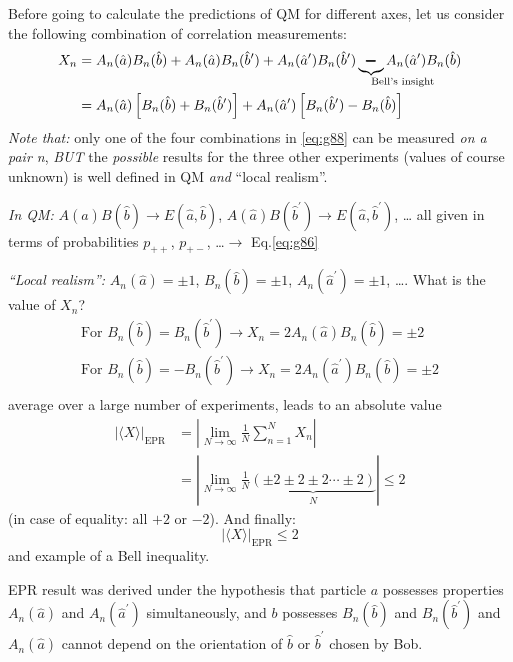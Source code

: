 \documentclass[12pt]{article}
\newcommand{\be}{\begin{equation}}
\newcommand{\ee}{\end{equation}}
\begin{document}
Before going to calculate the predictions of QM
for different axes, let us consider the following
combination of correlation measurements:
\be
\begin{aligned} 
X_{n} 
&=A_{n}(\hat{a}) B_{n}(\hat{b})+A_{n}(\hat{a}) B_{n}(\hat{b}^{\prime})+A_{n}(\hat{a}^{\prime}) B_{n}(\hat{b}^{\prime})\underbrace{\pmb{\boldsymbol{-}}}%
_{\mathrlap{\text{Bell's insight}}}
A_{n}(\hat{a}^{\prime})B_{n}(\hat{b})\\ 
&=A_{n}(\hat{a})\left[B_{n}(\hat{b})+B_{n}(\hat{b}^{\prime})\right]+A_{n}(\hat{a}^{\prime})\left[B_{n}(\hat{b}^{\prime})-B_{n}(\hat{b})\right]
\end{aligned}
\label{eq:g88}
\ee
\emph{Note that:} only one of the four combinations in
\eqref{eq:g88} can be measured \emph{on a pair n},
\emph{BUT} the \emph{possible} results for the three other
experiments (values of course unknown) is well
defined in QM \emph{and} ``local realism''.

\emph{In QM:} 
$A(\hat{a})B(\hat{b}) \to E(\hat{a},\hat{b})$,
$A(\hat{a})B(\hat{b}^\prime) \to E(\hat{a},\hat{b}^\prime)$, \ldots
all given in terms of probabilities $p_{++}$, $p_{+-}$, \ldots $\to$ Eq.\eqref{eq:g86}

\emph{``Local realism'':}
$A_{n}(\hat{a})=\pm 1$, $B_{n}(\hat{b})=\pm 1$, $A_{n}(\hat{a}^\prime)=\pm 1$, \ldots.
What is the value of $X_n$?
\be
\begin{gathered}
\text{For } B_n(\hat{b}) =  B_n(\hat{b}^\prime) \to 
X_n = 2 A_{n}(\hat{a}) B_n(\hat{b}) = \pm 2\\
\text{For } B_n(\hat{b}) =  -B_n(\hat{b}^\prime) \to 
X_n = 2 A_{n}(\hat{a}^\prime) B_n(\hat{b}) = \pm 2\\
\end{gathered}
\ee
average over a large number of experiments, leads to an absolute value
\be
\begin{aligned}
|\langle X\rangle|_{\text{EPR}}
&=\left|\lim _{N \rightarrow \infty} \frac{1}{N} \sum_{n=1}^{N} X_{n}\right|\\
&=|\lim _{N \rightarrow \infty} \frac{1}{N} 
\underbrace{(\pm 2 \pm 2 \pm 2 \cdots \pm 2)}_{N}| \leqslant 2
\end{aligned}
\ee
(in case of equality: all $+2$ or $-2$). And finally:
\be
|\langle X\rangle|_{\text{EPR}} \leqslant 2
\ee
and example of a Bell inequality.


EPR result was derived under the hypothesis
that particle $a$ possesses properties 
\(A_{n}(\hat{a})\) and
\(A_{n}(\hat{a}^{\prime})\) simultaneously, and $b$ possesses
\(B_{n}(\hat{b})\) and 
\(B_{n}(\hat{b}^{\prime})\)
and \(A_{n}(\hat{a})\) cannot depend on the orientation
of \(\hat{b}\) or \(\hat{b}^{\prime}\) chosen by Bob.
\end{document}
